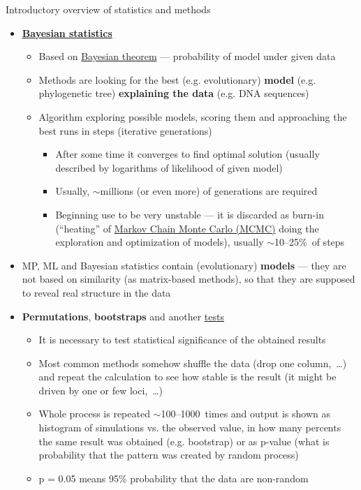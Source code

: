 \documentclass[compress, ucs, xelatex, 11pt, xcolor=svgnames, aspectratio=169,
	hyperref={
		bookmarks=true,
		unicode=true,
		colorlinks=true,
		pdftitle={Molecular data in R},
		plainpages=false,
		pdfauthor={Vojtech Zeisek},
		pdfsubject={Course about phylogeny and evolution in R},
		pdfcreator={XeLaTeX},
		pdfkeywords={R, evolution, phylogeny, molecular data},
		linkcolor=Crimson, %
		anchorcolor=Magenta, %
		citecolor=Magenta, %
		filecolor=Magenta, %
		menucolor=Magenta, %
		urlcolor=DodgerBlue, %
		pdftex},
	url={hyphens, lowtilde} %
	]{beamer}
\begin{document}
\begin{frame}[allowframebreaks]{Introductory overview of statistics and methods}
\begin{itemize}
\begin{itemize}
		\end{itemize}
		\item \textbf{\href{https://en.wikipedia.org/wiki/Bayesian_statistics}{Bayesian statistics}}
		\begin{itemize}
			\item Based on \href{https://en.wikipedia.org/wiki/Bayes_theorem}{Bayesian theorem} --- probability of model under given data
			\item Methods are looking for the best (e.g. evolutionary) \textbf{model} (e.g. phylogenetic tree) \textbf{explaining the data} (e.g. DNA sequences)
			\item Algorithm exploring possible models, scoring them and approaching the best runs in steps (iterative generations)
			\begin{itemize}
				\item After some time it converges to find optimal solution (usually described by logarithms of likelihood of given model)
				\item Usually, $\sim$millions (or even more) of generations are required
				\item Beginning use to be very unstable --- it is discarded as burn-in (\enquote{heating} of \href{https://en.wikipedia.org/wiki/Markov_chain_Monte_Carlo}{Markov Chain Monte Carlo (MCMC)} doing the exploration and optimization of models), usually $\sim$10--25\%~of steps
			\end{itemize}
		\end{itemize}
		\item MP, ML and Bayesian statistics contain (evolutionary) \textbf{models} --- they are not based on similarity (as matrix-based methods), so that they are supposed to reveal real structure in the data
		\item \textbf{Permutations}, \textbf{bootstraps} and another \href{https://en.wikipedia.org/wiki/Resampling_(statistics)}{tests}
		\begin{itemize}
			\item It is necessary to test statistical significance of the obtained results
			\item Most common methods somehow shuffle the data (drop one column,~\ldots) and repeat the calculation to see how stable is the result (it might be driven by one or few loci,~\ldots)
			\item Whole process is repeated $\sim$100--1000~times and output is shown as histogram of simulations vs. the observed value, in how many percents the same result was obtained (e.g. bootstrap) or as p-value (what is probability that the pattern was created by random process)
			\item p = 0.05 means 95\% probability that the data are non-random
		\end{itemize}
	\end{itemize}
\end{frame}
\end{document}

